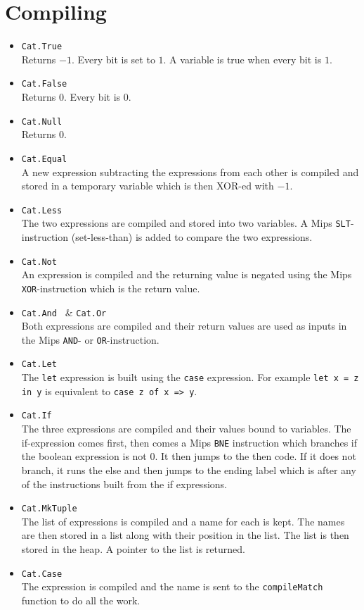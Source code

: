 \documentclass{article}
\begin{document}
\section{Compiling}
\begin{itemize}
	\item {\tt Cat.True } \\
	Returns $-1$. Every bit is set to $1$. A variable is true when every bit is $1$.
	\item {\tt Cat.False } \\
	Returns $0$. Every bit is $0$. 
	\item {\tt Cat.Null } \\
	Returns $0$.
	\item {\tt Cat.Equal } \\
	A new expression subtracting the expressions from each other is compiled and stored in a temporary variable which is then XOR-ed with $-1$.
	\item {\tt Cat.Less } \\
	The two expressions are compiled and stored into two variables. A Mips {\tt SLT}-instruction (set-less-than) is added to compare the two expressions.
	\item {\tt Cat.Not } \\
	An expression is compiled and the returning value is negated using the Mips {\tt XOR}-instruction which is the return value.
	\item {\tt Cat.And } \& {\tt Cat.Or } \\
	Both expressions are compiled and their return values are used as inputs in the Mips {\tt AND}- or {\tt OR}-instruction.
	\item {\tt Cat.Let } \\
	The {\tt let} expression is built using the {\tt case} expression. For example {\tt let x = z in y} is equivalent to {\tt case z of x => y}.
	\item {\tt Cat.If } \\
	The three expressions are compiled and their values bound to variables. The if-expression comes first, then comes a Mips {\tt BNE} instruction which branches if the boolean expression is not $0$. It then jumps to the then code.
	If it does not branch, it runs the else and then jumps to the ending label which is after any of the instructions built from the if expressions.
	\item {\tt Cat.MkTuple } \\
	The list of expressions is compiled and a name for each is kept. The names are then stored in a list along with their position in the list. The list is then stored in the heap. A pointer to the list is returned.
	\item {\tt Cat.Case } \\
	The expression is compiled and the name is sent to the {\tt compileMatch} function to do all the work.
\end{itemize}
\end{document}
